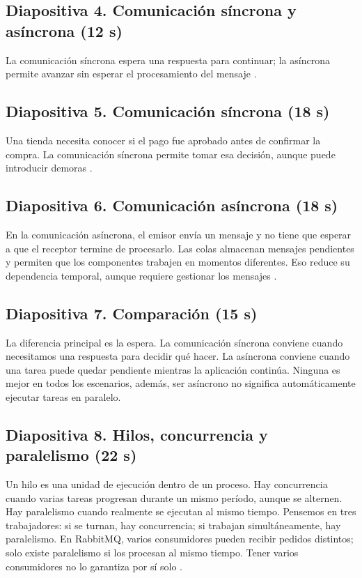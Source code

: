 \subsection*{Diapositiva 4. Comunicación síncrona y asíncrona (12 s)}
La comunicación síncrona espera una respuesta para continuar;
la asíncrona permite avanzar sin esperar el procesamiento
del mensaje \cite{kazanavicius2023}.

\subsection*{Diapositiva 5. Comunicación síncrona (18 s)}
Una tienda necesita conocer si el pago fue aprobado antes de
confirmar la compra. La comunicación síncrona permite tomar
esa decisión, aunque puede introducir demoras \cite{kazanavicius2023}.

\subsection*{Diapositiva 6. Comunicación asíncrona (18 s)}
En la comunicación asíncrona, el emisor envía un mensaje y
no tiene que esperar a que el receptor termine de procesarlo.
Las colas almacenan mensajes pendientes y permiten que los componentes
trabajen en momentos diferentes.
Eso reduce su dependencia temporal, aunque requiere gestionar
los mensajes \cite{maharjan2023,derlatka2023}.

\subsection*{Diapositiva 7. Comparación (15 s)}
La diferencia principal es la espera. La comunicación síncrona
conviene cuando necesitamos una respuesta para decidir qué hacer.
La asíncrona conviene cuando una tarea puede quedar pendiente mientras
la aplicación continúa. Ninguna es mejor en todos los escenarios,
además, ser asíncrono no significa automáticamente ejecutar tareas en paralelo.

\subsection*{Diapositiva 8. Hilos, concurrencia y paralelismo (22 s)}
Un hilo es una unidad de ejecución dentro de un proceso. Hay
concurrencia cuando varias tareas progresan durante un mismo
período, aunque se alternen. Hay paralelismo cuando realmente
se ejecutan al mismo tiempo. Pensemos en tres trabajadores:
si se turnan, hay concurrencia; si trabajan simultáneamente,
hay paralelismo. En RabbitMQ, varios consumidores pueden recibir pedidos distintos;
solo existe paralelismo si los procesan al mismo tiempo. Tener varios consumidores no
lo garantiza por sí solo \cite{reinders2023}.

